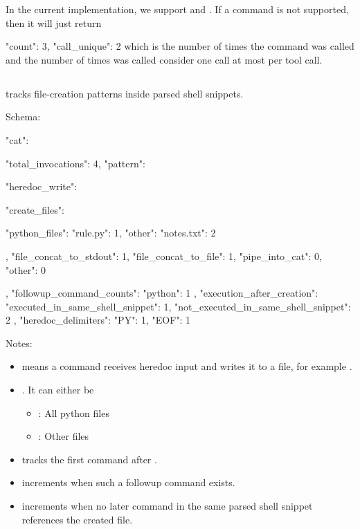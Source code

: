 \documentclass[11pt]{article}
\begin{document}
In the current implementation, we support  and .
If a command is not supported, then it will just return
\begin{DocCode}
  {"count": 3, "call_unique": 2} which is the number of times the command was called and the number of times was called consider one call at most per tool call.
\end{DocCode}

\subsection*{}

 tracks file-creation patterns inside parsed shell snippets.

Schema:

\begin{DocCode}
"cat": {
  "total_invocations": 4,
  "pattern": {
    "heredoc_write": {
      "create_files": {
        "python_files": {
          "rule.py": 1,
        }
        "other":{
          "notes.txt": 2
        }
        
      }
    },
    "file_concat_to_stdout": 1,
    "file_concat_to_file": 1,
    "pipe_into_cat": 0,
    "other": 0
  },
  "followup_command_counts": {
    "python": 1
  },
  "execution_after_creation": {
    "executed_in_same_shell_snippet": 1,
    "not_executed_in_same_shell_snippet": 2
  },
  "heredoc_delimiters": {
    "PY": 1,
    "EOF": 1
  }

}
\end{DocCode}

Notes:
\begin{itemize}
\item {} means a  command receives heredoc input and writes it to a file, for example .
\item {}. It can either be
\begin{itemize}
  \item {}: All python files
  \item {}: Other files
\end{itemize}
\item {} tracks the first command after .
\item {} increments when such a followup command exists.
\item {} increments when no later command in the same parsed shell snippet references the created file.
\end{itemize}
\end{document}

